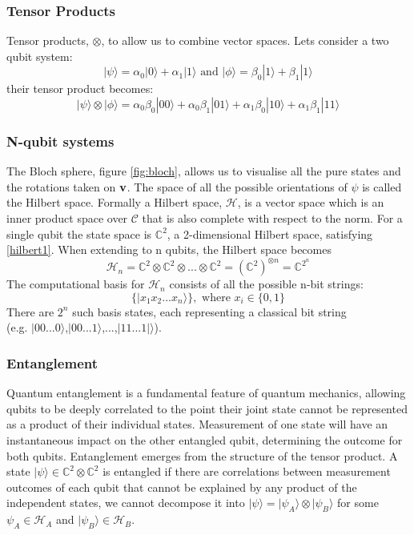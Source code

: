 \documentclass[12pt]{article}
\numberwithin{equation}{section}
\begin{document}
\subsubsection{Tensor Products}
Tensor products, $\otimes$, to allow us to combine vector spaces. Lets consider 
a two qubit system:
\begin{equation}
  |\psi\rangle = \alpha_0|0\rangle + \alpha_1|1\rangle \text{  and  }
  |\phi\rangle = \beta_0|1\rangle  + \beta_1|1\rangle
\end{equation}
their tensor product becomes:
\begin{equation}
  |\psi\rangle \otimes |\phi\rangle = 
  \alpha_0\beta_0|00\rangle + 
  \alpha_0\beta_1|01\rangle + 
  \alpha_1\beta_0|10\rangle + 
  \alpha_1\beta_1|11\rangle  
\end{equation}
\subsubsection{N-qubit systems}
The Bloch sphere, figure \ref{fig:bloch}, allows us to visualise all the pure states and the rotations taken 
on $\bold{v}$. 
The space of all the possible orientations of $\psi$ is called the Hilbert space. 
Formally a Hilbert space, $\mathcal{H}$, is a vector space which is an inner product space 
over $\mathcal{C}$ that is also complete with respect to the norm. For a single 
qubit the state space is $\mathbb{C}^2$, a 2-dimensional Hilbert space, satisfying 
\ref{hilbert1}. When extending to n qubits, the Hilbert space becomes 
\begin{equation}
  \mathcal{H}_n = \mathbb{C}^2 \otimes \mathbb{C}^2 \otimes ... \otimes \mathbb{C}^2 
  =(\mathbb{C}^2)^{\otimes n} = \mathbb{C}^{2^n}
\end{equation}
The computational basis for $\mathcal{H}_n$ consists of all the possible n-bit strings:
\begin{equation}
  \{|x_1x_2...x_n\rangle\}, \text{ where } x_i \in \{0,1\}
\end{equation}
There are $2^n$ such basis states, each representing a classical bit string\\
(e.g. $|00...0\rangle$,$|00...1\rangle$,...,$|11...1|\rangle$). 

\subsubsection{Entanglement}
Quantum entanglement is a fundamental feature of quantum mechanics, allowing 
qubits to be deeply correlated to the point their joint state cannot be represented 
as a product of their individual states. Measurement of one state will have an 
instantaneous impact on the other entangled qubit, determining the outcome for both 
qubits. 
Entanglement emerges from the structure of the tensor product. A state 
$|\psi\rangle \in \mathbb{C}^2 \otimes \mathbb{C}^2$ is entangled if there are 
correlations between measurement outcomes of each qubit that cannot be explained
by any product of the independent states, we cannot decompose it into 
$|\psi\rangle = |\psi_A\rangle \otimes |\psi_B\rangle$ for some $\psi_A \in \mathcal{H}_A$
and $|\psi_B\rangle \in \mathcal{H}_B$.
\end{document}
